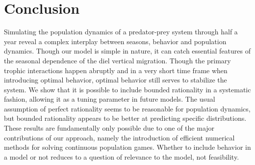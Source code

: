 \section{Conclusion} %
Simulating the population dynamics of a predator-prey system through half a year reveal a complex interplay between seasons, behavior and population dynamics. Though our model is simple in nature, it can catch essential features of the seasonal dependence of the diel vertical migration. Though the primary trophic interactions happen abruptly and in a very short time frame when introducing optimal behavior, optimal behavior still serves to stabilize the system.
We show that it is possible to include bounded rationality in a systematic fashion, allowing it as a tuning parameter in future models. The usual assumption of perfect rationality seems to be reasonable for population dynamics, but bounded rationality appears to be better at predicting specific distributions.
These results are fundamentally only possible due to one of the major contributions of our approach, namely the introduction of efficient numerical methods for solving continuous population games. Whether to include behavior in a model or not reduces to a question of relevance to the model, not feasibility.

